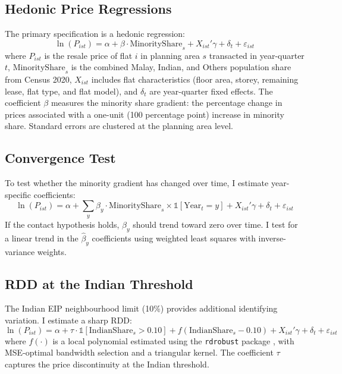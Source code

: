 \documentclass[12pt]{article}
\begin{document}
\subsection{Hedonic Price Regressions}

The primary specification is a hedonic regression:
\begin{equation}
\ln(P_{ist}) = \alpha + \beta \cdot \text{MinorityShare}_s + X_{ist}'\gamma + \delta_t + \varepsilon_{ist}
\label{eq:hedonic}
\end{equation}
where $P_{ist}$ is the resale price of flat $i$ in planning area $s$ transacted in year-quarter $t$, $\text{MinorityShare}_s$ is the combined Malay, Indian, and Others population share from Census 2020, $X_{ist}$ includes flat characteristics (floor area, storey, remaining lease, flat type, and flat model), and $\delta_t$ are year-quarter fixed effects. The coefficient $\beta$ measures the minority share gradient: the percentage change in prices associated with a one-unit (100 percentage point) increase in minority share. Standard errors are clustered at the planning area level.

\subsection{Convergence Test}

To test whether the minority gradient has changed over time, I estimate year-specific coefficients:
\begin{equation}
\ln(P_{ist}) = \alpha + \sum_{y} \beta_y \cdot \text{MinorityShare}_s \times \mathbb{1}[\text{Year}_t = y] + X_{ist}'\gamma + \delta_t + \varepsilon_{ist}
\label{eq:convergence}
\end{equation}
If the contact hypothesis holds, $\beta_y$ should trend toward zero over time. I test for a linear trend in the $\hat{\beta}_y$ coefficients using weighted least squares with inverse-variance weights.

\subsection{RDD at the Indian Threshold}

The Indian EIP neighbourhood limit (10\%) provides additional identifying variation. I estimate a sharp RDD:
\begin{equation}
\ln(P_{ist}) = \alpha + \tau \cdot \mathbb{1}[\text{IndianShare}_s > 0.10] + f(\text{IndianShare}_s - 0.10) + X_{ist}'\gamma + \delta_t + \varepsilon_{ist}
\label{eq:rdd}
\end{equation}
where $f(\cdot)$ is a local polynomial estimated using the \texttt{rdrobust} package \citep{cattaneo2020}, with MSE-optimal bandwidth selection and a triangular kernel. The coefficient $\tau$ captures the price discontinuity at the Indian threshold.
\end{document}
